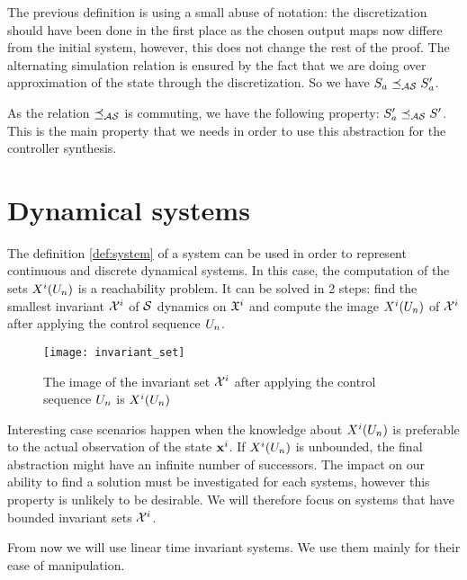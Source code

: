 The previous definition is using a small abuse of notation: the discretization should have been done in the first place as the chosen output maps now differe from the initial system, however, this does not change the rest of the proof.
The alternating simulation relation is ensured by the fact that we are doing over approximation of the state through the discretization. So we have $S_a \preceq_{\mathcal{AS}} S_a'$.

As the relation $\preceq_{\mathcal{AS}}$ is commuting, we have the following property:
$S_a' \preceq_{\mathcal{AS}} S'$. This is the main property that we needs in order to use this abstraction for the controller synthesis.



\section{Dynamical systems}
The definition \ref{def:system} of a system can be used in order to represent continuous and discrete dynamical systems.
In this case, the computation of the sets $X^i(U_n)$ is a reachability problem.
It can be solved in 2 steps: find the smallest invariant ${\mathcal{X}^i}$ of $\mathcal{S}$ dynamics on $\mathfrak{X}^i$ and compute the image $X^i(U_n)$ of ${\mathcal{X}^i}$ after applying the control sequence $U_n$.

\begin{figure}
\centering
\texttt{[image: invariant\_set]}
\caption{The image of the invariant set ${\mathcal{X}^i}$ after applying the control sequence $U_n$ is $X^i(U_n)$}
\end{figure}

Interesting case scenarios happen when the knowledge about $X^i(U_n)$ is preferable to the actual observation of the state $ \mathbf{x}^i$.
If $X^i(U_n)$ is unbounded, the final abstraction might have an infinite number of successors. The impact on our ability to find a solution must be investigated for each systems, however this property is unlikely to be desirable.
We will therefore focus on systems that have bounded invariant sets ${\mathcal{X}^i}$.

From now we will use linear time invariant systems. We use them mainly for their ease of manipulation.